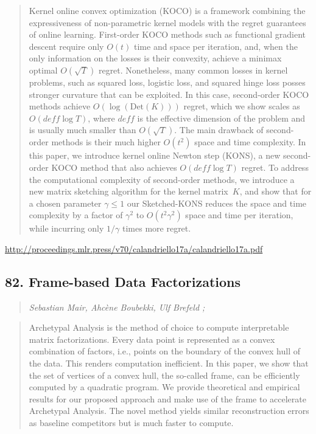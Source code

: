 \documentclass{article}
\begin{document}
\begin{quote}
    Kernel online convex optimization (KOCO) is a framework combining the expressiveness of non-parametric kernel models with the regret guarantees of online learning. First-order KOCO methods such as functional gradient descent require only $O(t)$ time and space per iteration, and, when the only information on the losses is their convexity, achieve a minimax optimal $O(\sqrt{T})$ regret. Nonetheless, many common losses in kernel problems, such as squared loss, logistic loss, and squared hinge loss posses stronger curvature that can be exploited. In this case, second-order KOCO methods achieve $O(\log(\mathrm{Det}(K)))$ regret, which we show scales as $O(deff \log T)$, where $deff$ is the effective dimension of the problem and is usually much smaller than $O(\sqrt{T})$. The main drawback of second-order methods is their much higher $O(t^2)$ space and time complexity. In this paper, we introduce kernel online Newton step (KONS), a new second-order KOCO method that also achieves $O(deff\log T)$ regret. To address the computational complexity of second-order methods, we introduce a new matrix sketching algorithm for the kernel matrix~$K$, and show that for a chosen parameter $\gamma \leq 1$ our Sketched-KONS reduces the space and time complexity by a factor of $\gamma^2$ to $O(t^2\gamma^2)$ space and time per iteration, while incurring only $1/\gamma$ times more regret.  
\end{quote}

\href{http://proceedings.mlr.press/v70/calandriello17a/calandriello17a.pdf}{http://proceedings.mlr.press/v70/calandriello17a/calandriello17a.pdf}

\subsection{82. Frame-based Data Factorizations}

\begin{quote}
\footnotesize{\textit{Sebastian Mair, Ahcène Boubekki, Ulf Brefeld ;}}

\end{quote}

\begin{quote}
    Archetypal Analysis is the method of choice to compute interpretable matrix factorizations. Every data point is represented as a convex combination of factors, i.e., points on the boundary of the convex hull of the data. This renders computation inefficient. In this paper, we show that the set of vertices of a convex hull, the so-called frame, can be efficiently computed by a quadratic program. We provide theoretical and empirical results for our proposed approach and make use of the frame to accelerate Archetypal Analysis. The novel method yields similar reconstruction errors as baseline competitors but is much faster to compute.  
\end{quote}
\end{document}
